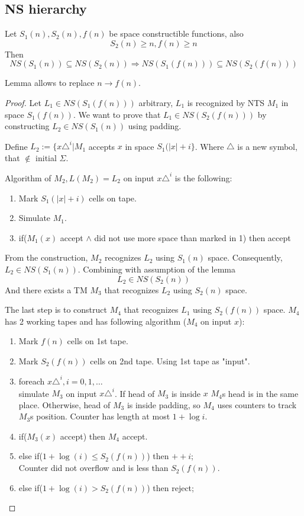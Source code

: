 \subsection{NS hierarchy}

\begin{lemma}\label{transl_space}
	Let $S_1(n), S_2(n), f(n)$ be space constructible functions, also
	\[ S_2(n) \geq n, f(n) \geq n \]
	Then
	\[ NS(S_1(n)) \subseteq NS(S_2(n)) \Rightarrow NS(S_1(f(n))) \subseteq NS(S_2(f(n))) \]

	Lemma allows to replace $n \to f(n)$.
\end{lemma}
\begin{proof}
	Let $L_1 \in NS(S_1(f(n)))$ arbitrary, $L_1$ is recognized by NTS $M_1$ in space $S_1(f(n))$.
	We want to prove that $L_1 \in NS(S_2(f(n)))$ by constructing $L_2 \in NS(S_1(n))$ using padding.

	Define $L_2 := \{ x\triangle^i | M_1 $ accepts $x$ in space $S_1(|x| + i \} $.
	Where $\triangle$ is a new symbol, that $\notin $ initial $\Sigma$.

	Algorithm of $M_2, L(M_2) = L_2$ on input $x\triangle^i$ is the following:
\begin{enumerate}
	\item Mark $S_1(|x| + i)$ cells on tape.
	\item Simulate $M_1$.
	\item if($M_1(x)$ accept $\land$ did not use more space than marked in 1) then accept
\end{enumerate}
	From the construction, $M_2$ recognizes $L_2$ using $S_1(n)$ space.
	Consequently, $L_2 \in NS(S_1(n))$.
	Combining with assumption of the lemma
	\[ L_2 \in NS(S_2(n)) \]
	And there exists a TM $M_3$ that recognizes $L_2$ using $S_2(n)$ space.

	The last step is to construct $M_4$ that recognizes $L_1$ using $S_2(f(n))$ space.
	$M_4$ has 2 working tapes and has following algorithm ($M_4$ on input $x$):
\begin{enumerate}
	\item Mark $f(n)$ cells on 1st tape.
	\item Mark $S_2(f(n))$ cells on 2nd tape. Using 1st tape as "input".
	\item foreach $x\triangle^i, i = 0, 1, \ldots $ \\
		simulate $M_3$ on input $x\triangle^i$.
		If head of $M_3$ is inside $x$ $M_4$s head is in the same place.
		Otherwise, head of $M_3$ is inside padding, so $M_4$ uses counters to track $M_3$s position.
		Counter has length at most $1 + \log i$.
	\item if($M_3(x)$ accept) then $M_4$ accept.
	\item else if($1 + \log(i) \leq S_2(f(n))$) then $++i$; \\
		Counter did not overflow and is less than $S_2(f(n))$.
	\item else if($1 + \log(i) > S_2(f(n))$) then reject;
\end{enumerate}


\end{proof}
